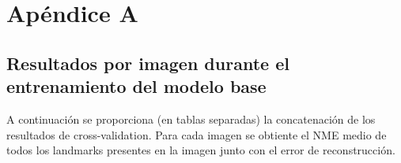 
\chapter{Apéndice A}\label{ap:apendiceA}

\section{Resultados por imagen durante el entrenamiento del modelo base}

\noindent A continuación se proporciona (en tablas separadas) la concatenación de los resultados de cross-validation. Para cada imagen se obtiente el NME medio de todos los landmarks presentes en la imagen junto con el error de reconstrucción.

